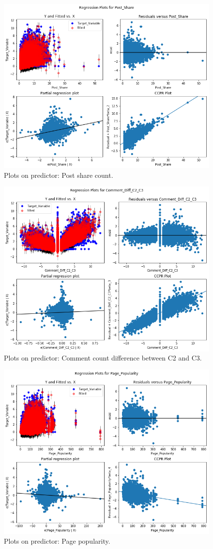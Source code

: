 \documentclass[]{article}
\begin{document}
%
%
\begin{figure}[hbtp]
	\centering
	\includegraphics[width=.8\columnwidth]{../Figures/prp_complex_3}
	\caption{Plots on predictor: Post share count.}
	\label{fig:prp_complex_3}
\end{figure}
%
%
\begin{figure}[hbtp]
	\centering
	\includegraphics[width=.8\columnwidth]{../Figures/prp_complex_4}
	\caption{Plots on predictor: Comment count difference between C2 and C3.}
	\label{fig:prp_complex_4}
\end{figure}
%
%
\begin{figure}[hbtp]
	\centering
	\includegraphics[width=.8\columnwidth]{../Figures/prp_complex_5}
	\caption{Plots on predictor: Page popularity.}
	\label{fig:prp_complex_5}
\end{figure}
%
\end{document}
